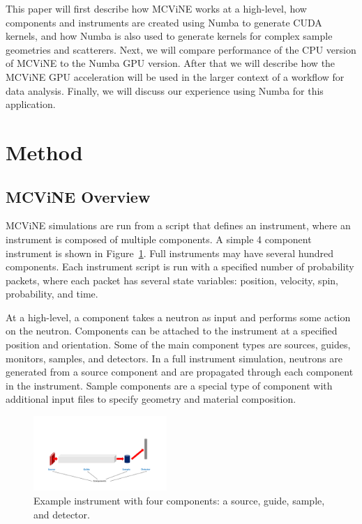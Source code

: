 This paper will first describe how MCViNE works at a high-level, how components and instruments are created using Numba to generate CUDA kernels, and how Numba is also used to generate kernels for complex sample geometries and scatterers.
Next, we will compare performance of the CPU version of MCViNE to the Numba GPU version.
After that we will describe how the MCViNE GPU acceleration will be used in the larger context of a workflow for data analysis.
Finally, we will discuss our experience using Numba for this application.


\section{Method}

\subsection{MCViNE Overview}

MCViNE simulations are run from a script that defines an instrument, where an instrument is composed of multiple components. A simple 4 component instrument is shown in Figure~\ref{fig:instrument}. Full instruments may have several hundred components. Each instrument script is run with a specified number of probability packets, where each packet has several state variables: position, velocity, spin, probability, and time.

At a high-level, a component takes a neutron as input and performs some action on the neutron. Components can be attached to the instrument at a specified position and orientation. Some of the main component types are sources, guides, monitors, samples, and detectors. In a full instrument simulation, neutrons are generated from a source component and are propagated through each component in the instrument. Sample components are a special type of component with additional input files to specify geometry and material composition.

\begin{figure}[ht]
    \centering
    \includegraphics[width=0.45\textwidth, trim={3.5cm 1cm 3.5cm 5cm}, clip]{figures/mcvine_acc_instrument_component_fig.pdf}
    \caption{Example instrument with four components: a source, guide, sample, and detector.}
    \label{fig:instrument}
\end{figure}


